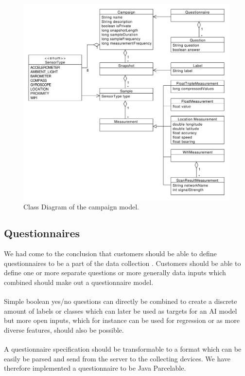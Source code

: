 
\begin{figure}[!htbp]
    \centering
    \includegraphics[width=\textwidth]{graphic/gathering_sensor_data/model_class_diagram.pdf}
    \caption{Class Diagram of the campaign model.}
    \label{fig:model_class_diagram}
\end{figure}
\FloatBarrier


\subsection{Questionnaires}
We had come to the conclusion that customers should be able to define questionnaires to be a part of the data collection . Customers should be able to define one or more separate questions or more generally data inputs which combined should make out a questionnaire model. 
\\\\
Simple boolean yes/no questions can directly be combined to create a discrete amount of labels or classes which can later be used as targets for an AI model but more open inputs, which for instance can be used for regression or as more diverse features, should also be possible. 
\\\\
A questionnaire specification should be transformable to a format which can be easily be parsed and send from the server to the collecting devices. We have therefore implemented a questionnaire to be Java Parcelable. 

